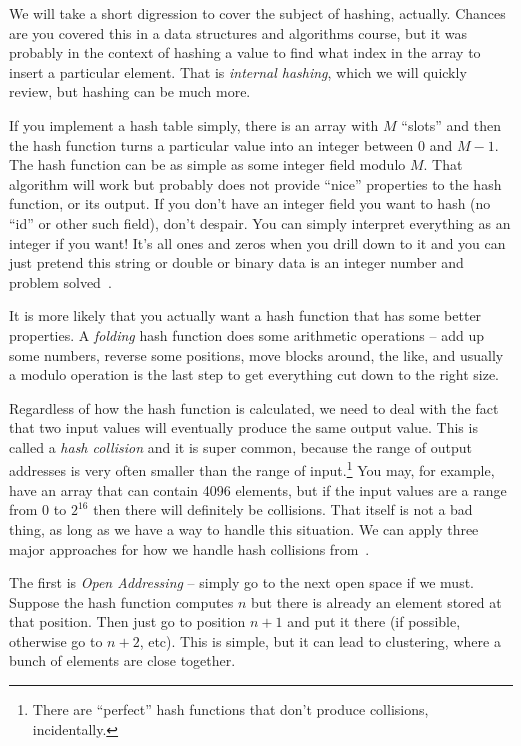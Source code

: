 \documentclass[a4paper]{report}
\begin{document}
We will take a short digression to cover the subject of hashing, actually. Chances are you covered this in a data structures and algorithms course, but it was probably in the context of hashing a value to find what index in the array to insert a particular element. That is \textit{internal hashing}, which we will quickly review, but hashing can be much more.

If you implement a hash table simply, there is an array with $M$ ``slots'' and then the hash function turns a particular value into an integer between $0$ and $M-1$. The hash function can be as simple as some integer field modulo $M$. That algorithm will work but probably does not provide ``nice'' properties to the hash function, or its output. If you don't have an integer field you want to hash (no ``id'' or other such field), don't despair. You can simply interpret everything as an integer if you want! It's all ones and zeros when you drill down to it and you can just pretend this string or double or binary data is an integer number and problem solved~\cite{fds}.

It is more likely that you actually want a hash function that has some better properties. A \textit{folding} hash function does some arithmetic operations -- add up some numbers, reverse some positions, move blocks around, the like, and usually a modulo operation is the last step to get everything cut down to the right size.

Regardless of how the hash function is calculated, we need to deal with the fact that two input values will eventually produce the same output value. This is called a \textit{hash collision} and it is super common, because the range of output addresses is very often smaller than the range of input.\footnote{There are ``perfect'' hash functions that don't produce collisions, incidentally.} You may, for example, have an array that can contain 4096 elements, but if the input values are a range from $0$ to $2^{16}$ then there will definitely be collisions. That itself is not a bad thing, as long as we have a way to handle this situation. We can apply three major approaches for how we handle hash collisions from~\cite{fds}. 

The first is \textit{Open Addressing} -- simply go to the next open space if we must. Suppose the hash function computes $n$ but there is already an element stored at that position. Then just go to position $n+1$ and put it there (if possible, otherwise go to $n+2$, etc). This is simple, but it can lead to clustering, where a bunch of elements are close together.
\end{document}
